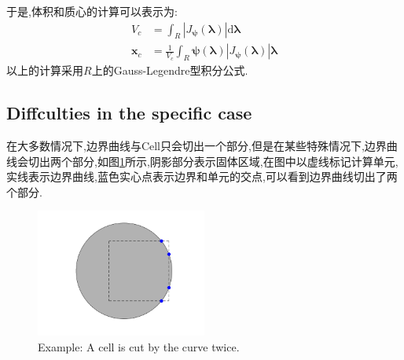 \documentclass[12pt,halfline,a4paper]{ouparticle}
\begin{document}
\newline 
于是,体积和质心的计算可以表示为:
\begin{equation}\label{eq:volume_centorid}
\begin{aligned}
    V_{c} &= \int_{R} |J_{\boldsymbol{\psi}}(\boldsymbol{\lambda})| \mathrm{d} \boldsymbol{\lambda}\\
    \boldsymbol{x}_{c} &= \frac{1}{V_{c}} \int_{R} \boldsymbol{\psi}(\boldsymbol{\lambda}) |J_{\boldsymbol{\psi}}(\boldsymbol{\lambda})|\boldsymbol{\lambda}
\end{aligned}
\end{equation}
以上的计算采用$R$上的Gauss-Legendre型积分公式.




\subsection{Diffculties in the specific case}
在大多数情况下,边界曲线与Cell只会切出一个部分,但是在某些特殊情况下,边界曲线会切出两个部分,如图\ref{fig:cut_cell_example}所示,阴影部分表示固体区域,在图中以虚线标记计算单元,实线表示边界曲线,蓝色实心点表示边界和单元的交点,可以看到边界曲线切出了两个部分.



\begin{figure}[H]
    \centering
    \includegraphics[width=0.5\textwidth]{figure/cut_cell_example.png}
    \caption{Example: A cell is cut by the curve twice.}
    \label{fig:cut_cell_example}
\end{figure}






\newpage


\end{document}
